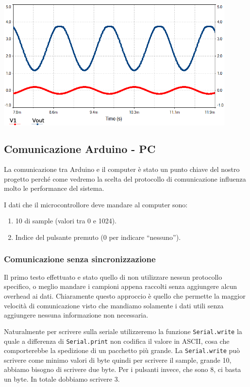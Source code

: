 \documentclass[a4paper,11pt]{article}
\begin{document}
\begin{center}
\includegraphics[width=0.9\textwidth]{screen2.png}
\end{center}

\subsection{Comunicazione Arduino - PC}
La comunicazione tra Arduino e il computer è stato un punto chiave del nostro progetto perché come vedremo la scelta del protocollo di comunicazione influenza molto le performance del sistema.

I dati che il microcontrollore deve mandare al computer sono:
\begin{enumerate}
    \item \SI{10}{\bit} di sample (valori tra \num{0} e \num{1024}).
    \item Indice del pulsante premuto (\num{0} per indicare ``nessuno'').
\end{enumerate}

\subsubsection{Comunicazione senza sincronizzazione}
Il primo testo effettuato e stato quello di non utilizzare nessun protocollo specifico, o meglio mandare i campioni appena raccolti senza aggiungere alcun overhead ai dati. Chiaramente questo approccio è quello che permette la maggior velocità di comunicazione visto che mandiamo solamente i dati utili senza aggiungere nessuna informazione non necessaria.

Naturalmente per scrivere sulla seriale utilizzeremo la funzione \texttt{Serial.write} la quale a differenza di \texttt{Serial.print} non codifica il valore in ASCII, cosa che comporterebbe la spedizione di un pacchetto più grande. La \texttt{Serial.write} può scrivere come minimo valori di byte quindi per scrivere il sample, grande \SI{10}{\bit}, abbiamo bisogno di scrivere due byte. Per i pulsanti invece, che sono 8, ci basta un byte. In totale dobbiamo scrivere \SI{3}{\byte}.
\end{document}
